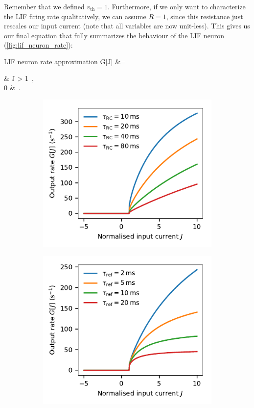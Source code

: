 \documentclass[10pt,letterpaper,oneside]{article}
\begin{document}
Remember that we defined $v_\mathrm{th} = 1$. Furthermore, if we only want to characterize the LIF firing rate qualitatively, we can assume $R = 1$, since this resistance just rescales our input current (note that all variables are now unit-less). This gives us our final equation that fully summarizes the behaviour of the LIF neuron (\cref{fig:lif_neuron_rate}):
\begin{ImportantEqn}{LIF neuron rate approximation}
	G[J]
	&= \begin{cases}
	 &  J > 1 \,,\\
	0 &  \,.
	\end{cases}
\end{ImportantEqn}


\begin{figure}
	\centering%
	\begin{subfigure}{0.5\textwidth}%
		\centering%
		\includegraphics{media/lif_neuron_rate_tau_rc.pdf}%
	\end{subfigure}%
	\begin{subfigure}{0.5\textwidth}%
		\centering%
		\includegraphics{media/lif_neuron_rate_tau_ref.pdf}%

\end{subfigure}
\end{figure}
\end{document}
